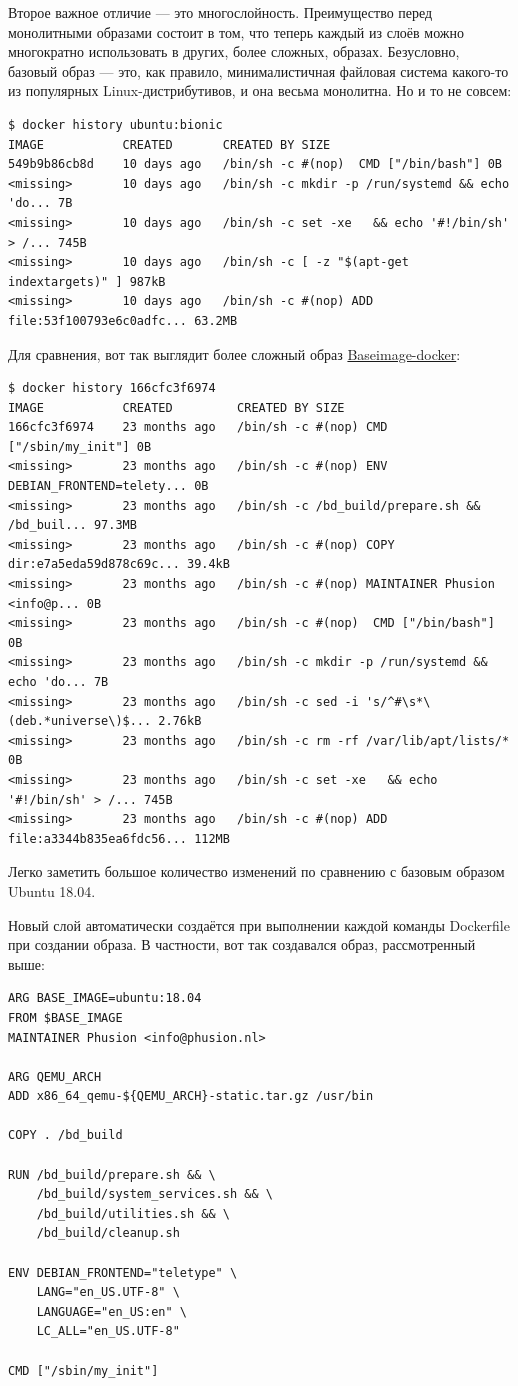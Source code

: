 \documentclass[14pt, a4paper]{article}
\begin{document}
Второе важное отличие — это многослойность. Преимущество перед монолитными образами состоит
в том, что теперь каждый из слоёв можно многократно использовать в других, более сложных,
образах. Безусловно, базовый образ — это, как правило, минималистичная файловая система
какого-то из популярных Linux-дистрибутивов, и она весьма монолитна. Но и то не совсем:
\begin{lstlisting}
$ docker history ubuntu:bionic
IMAGE           CREATED       CREATED BY SIZE
549b9b86cb8d    10 days ago   /bin/sh -c #(nop)  CMD ["/bin/bash"] 0B
<missing>       10 days ago   /bin/sh -c mkdir -p /run/systemd && echo 'do... 7B
<missing>       10 days ago   /bin/sh -c set -xe   && echo '#!/bin/sh' > /... 745B
<missing>       10 days ago   /bin/sh -c [ -z "$(apt-get indextargets)" ] 987kB
<missing>       10 days ago   /bin/sh -c #(nop) ADD file:53f100793e6c0adfc... 63.2MB 
\end{lstlisting}

Для сравнения, вот так выглядит более сложный образ \href{https://github.com/phusion/baseimage-docker}{Baseimage-docker}:
\begin{lstlisting}
$ docker history 166cfc3f6974
IMAGE           CREATED         CREATED BY SIZE
166cfc3f6974    23 months ago   /bin/sh -c #(nop) CMD ["/sbin/my_init"] 0B
<missing>       23 months ago   /bin/sh -c #(nop) ENV DEBIAN_FRONTEND=telety... 0B
<missing>       23 months ago   /bin/sh -c /bd_build/prepare.sh &&  /bd_buil... 97.3MB
<missing>       23 months ago   /bin/sh -c #(nop) COPY dir:e7a5eda59d878c69c... 39.4kB
<missing>       23 months ago   /bin/sh -c #(nop) MAINTAINER Phusion <info@p... 0B
<missing>       23 months ago   /bin/sh -c #(nop)  CMD ["/bin/bash"] 0B
<missing>       23 months ago   /bin/sh -c mkdir -p /run/systemd && echo 'do... 7B
<missing>       23 months ago   /bin/sh -c sed -i 's/^#\s*\(deb.*universe\)$... 2.76kB
<missing>       23 months ago   /bin/sh -c rm -rf /var/lib/apt/lists/* 0B
<missing>       23 months ago   /bin/sh -c set -xe   && echo '#!/bin/sh' > /... 745B
<missing>       23 months ago   /bin/sh -c #(nop) ADD file:a3344b835ea6fdc56... 112MB
\end{lstlisting}

Легко заметить большое количество изменений по сравнению с базовым образом Ubuntu 18.04.

Новый слой автоматически создаётся при выполнении каждой команды Dockerfile при создании
образа. В частности, вот так создавался образ, рассмотренный выше:
\begin{lstlisting}[language=docker]
ARG BASE_IMAGE=ubuntu:18.04
FROM $BASE_IMAGE
MAINTAINER Phusion <info@phusion.nl>

ARG QEMU_ARCH
ADD x86_64_qemu-${QEMU_ARCH}-static.tar.gz /usr/bin 

COPY . /bd_build

RUN /bd_build/prepare.sh && \
    /bd_build/system_services.sh && \
    /bd_build/utilities.sh && \
    /bd_build/cleanup.sh

ENV DEBIAN_FRONTEND="teletype" \ 
    LANG="en_US.UTF-8" \ 
    LANGUAGE="en_US:en" \ 
    LC_ALL="en_US.UTF-8"

CMD ["/sbin/my_init"]
\end{lstlisting}
\end{document}
